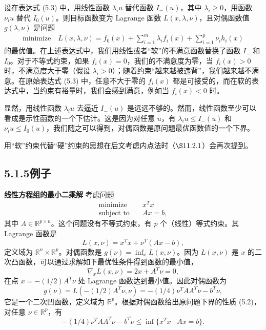 \documentclass[UTF8, 12pt, fontset=fandol, oneside]{ctexart}
\begin{document}
设在表达式 (5.3) 中，用线性函数 $\lambda_i u$ 替代函数 $I_-(u)$，其中 $\lambda_i\geq 0$，用函数 $\nu_i u$ 替代 $I_0(u)$。则目标函数变为 Lagrange 函数 $L(x,\lambda,\nu)$，且对偶函数值 $g(\lambda,\nu)$ 是问题
\begin{equation}
\begin{aligned}
\text{minimize}\quad
L(x,\lambda,\nu)=f_0(x)+\sum_{i=1}^m \lambda_i f_i(x)+\sum_{i=1}^p \nu_i h_i(x)
\end{aligned}
\tag{5.4}
\end{equation}
的最优值。在上述表达式中，我们用线性或者``软''的不满意函数替换了函数 $I_-$ 和 $I_0$。对于不等式约束，如果 $f_i(x)=0$，我们的不满意度为零，当 $f_i(x)>0$ 时，不满意度大于零（假设 $\lambda_i>0$）；随着约束``越来越被违背''，我们越来越不满意。在原始表达式 (5.3) 中，任意不大于零的 $f_i(x)$ 都是可接受的，而在软的表达式中，当约束有裕量时，我们会感到满意，例如当 $f_i(x)<0$ 时。

显然，用线性函数 $\lambda_i u$ 去逼近 $I_-(u)$ 是远远不够的。然而，线性函数至少可以看成是示性函数的一个下估计。这是因为对任意 $u$，有 $\lambda_i u\leq I_-(u)$ 和 $\nu_i u\leq I_0(u)$，我们随之可以得到，对偶函数是原问题最优函数值的一个下界。

用``软''约束代替``硬''约束的思想在后文考虑内点法时（$\S 11.2.1$）会再次提到。

\subsection*{5.1.5\quad 例子}

\noindent\textbf{线性方程组的最小二乘解}\quad
考虑问题
\begin{equation}
\begin{aligned}
\text{minimize}\quad & x^T x\\
\text{subject to}\quad & Ax=b,
\end{aligned}
\tag{5.5}
\end{equation}
其中 $A\in\mathbb{R}^{p\times n}$。这个问题没有不等式约束，有 $p$ 个（线性）等式约束。其 Lagrange 函数是
\[
L(x,\nu)=x^Tx+\nu^T(Ax-b),
\]
定义域为 $\mathbb{R}^n\times\mathbb{R}^p$。对偶函数是 $g(\nu)=\inf_x L(x,\nu)$。因为 $L(x,\nu)$ 是 $x$ 的二次凸函数，可以通过求解如下最优性条件得到函数的最小值，
\[
\nabla_x L(x,\nu)=2x+A^T\nu=0,
\]
在点 $x=-(1/2)A^T\nu$ 处 Lagrange 函数达到最小值。因此对偶函数为
\[
g(\nu)=L(-(1/2)A^T\nu,\nu)=-(1/4)\nu^TAA^T\nu-b^T\nu,
\]
它是一个二次凹函数，定义域为 $\mathbb{R}^p$。根据对偶函数给出原问题下界的性质 (5.2)，对任意 $\nu\in\mathbb{R}^p$，有
\[
-(1/4)\nu^TAA^T\nu-b^T\nu\leq \inf\{x^Tx\mid Ax=b\}.
\]
\end{document}
